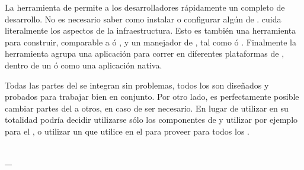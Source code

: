 La herramienta \clitool de \meteorNAME permite a los desarrolladores rápidamente \setup un \environmentPL completo de desarrollo. No es necesario saber como instalar o configurar algún \softwarePC de \serverAS. \meteorNAME cuida literalmente los aspectos de la infraestructura. Esto es también una herramienta para construir, comparable a \maketool ó \grunttoolNAME, y un manejador de \packageAS, tal como \apttool ó \npm. Finalmente la herramienta \clitool agrupa una aplicación para correr en diferentes plataformas de \clientsAS, dentro de un \browserINT \webINT ó como una aplicación \mobileINT nativa.

Todas las partes del \stackAS se integran sin problemas, todos los \packagesAS \coreAS son diseñados y probados para trabajar bien en conjunto. Por otro lado, es perfectamente posible cambiar partes del \stackAS a otros, en caso de ser necesario. En lugar de utilizar \meteorNAME en su totalidad podría decidir utilizarse sólo los componentes de \serverAS y utilizar por ejemplo \angularjsNAME para el \clientSideAS, o utilizar un \javabackend que utilice \meteorNAME en el \frontEndAS para proveer \updates \realTimeINT para todos los \clientsAS.

\subsection{\frameworkPC \isomorphicAS – \fullstackAS \javaScriptNAME}


